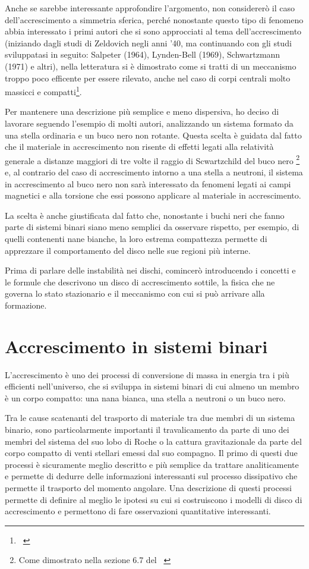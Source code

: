 \documentclass[a4paperbi]{article}
\begin{document}
Anche se sarebbe interessante approfondire l'argomento, non considererò il caso dell'accrescimento a simmetria sferica, perché nonostante questo tipo di fenomeno abbia interessato i primi autori che si sono approcciati al tema dell'accrescimento (iniziando dagli studi di Zeldovich negli anni '40, ma continuando con gli studi sviluppatasi in seguito: Salpeter (1964), Lynden-Bell (1969), Schwartzmann (1971) e altri), nella letteratura si è dimostrato come si tratti di un meccanismo troppo poco efficente per essere rilevato, anche nel caso di corpi centrali molto massicci e compatti\footnote{~\cite{PringleReesePacholczyk1973}}.

Per mantenere una descrizione più semplice e meno dispersiva, ho deciso di lavorare seguendo l'esempio di molti autori, analizzando un sistema formato da una stella ordinaria e un buco nero non rotante. Questa scelta è guidata dal fatto che il materiale in accrescimento non risente di effetti legati alla relatività generale a distanze maggiori di tre volte il raggio di Scwartzchild del buco nero
\footnote{Come dimostrato nella sezione 6.7 del ~\cite{FrankKingRaineAccretionPower}}
e, al contrario del caso di accrescimento intorno a una stella a neutroni, il sistema in accrescimento al buco nero non sarà interessato da fenomeni legati ai campi magnetici e alla torsione che essi possono applicare al materiale in accrescimento.

La scelta è anche giustificata dal fatto che, nonostante i buchi neri che fanno parte di sistemi binari siano meno semplici da osservare rispetto, per esempio, di quelli contenenti nane bianche, la loro estrema compattezza permette di apprezzare il comportamento del disco nelle sue regioni più interne.

Prima di parlare delle instabilità nei dischi, comincerò introducendo i concetti e le formule che descrivono un disco di accrescimento sottile, la fisica che ne governa lo stato stazionario e il meccanismo con cui si può arrivare alla formazione.

\newpage
\section{Accrescimento in sistemi binari}
	L'accrescimento è uno dei processi di conversione di massa in energia tra i più efficienti nell'universo, che si sviluppa in sistemi binari di cui almeno un membro è un corpo compatto: una nana bianca, una stella a neutroni o un buco nero.

	Tra le cause scatenanti del trasporto di materiale tra due membri di un sistema binario, sono particolarmente importanti il travalicamento da parte di uno dei membri del sistema del suo lobo di Roche o la cattura gravitazionale da parte del corpo compatto di venti stellari emessi dal suo compagno. Il primo di questi due processi è sicuramente meglio descritto e più semplice da trattare analiticamente e permette di dedurre delle informazioni interessanti sul processo dissipativo che permette il trasporto del momento angolare. Una descrizione di questi processi permette di definire al meglio le ipotesi su cui si costruiscono i modelli di disco di accrescimento e permettono di fare osservazioni quantitative interessanti.
	
\end{document}
